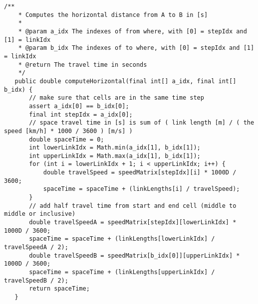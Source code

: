 \begin{lstlisting}[basicstyle=\tiny, style=java, caption={horizontal distance calculation}, label=lst:distance_calc_horizontal] 
	/**
	* Computes the horizontal distance from A to B in [s]
	*
	* @param a_idx The indexes of from where, with [0] = stepIdx and [1] = linkIdx
	* @param b_idx The indexes of to where, with [0] = stepIdx and [1] = linkIdx
	* @return The travel time in seconds
	*/
   public double computeHorizontal(final int[] a_idx, final int[] b_idx) {
	   // make sure that cells are in the same time step
	   assert a_idx[0] == b_idx[0];
	   final int stepIdx = a_idx[0];
	   // space travel time in [s] is sum of ( link length [m] / ( the speed [km/h] * 1000 / 3600 ) [m/s] )
	   double spaceTime = 0;
	   int lowerLinkIdx = Math.min(a_idx[1], b_idx[1]);
	   int upperLinkIdx = Math.max(a_idx[1], b_idx[1]);
	   for (int i = lowerLinkIdx + 1; i < upperLinkIdx; i++) {
		   double travelSpeed = speedMatrix[stepIdx][i] * 1000D / 3600;
		   spaceTime = spaceTime + (linkLengths[i] / travelSpeed);
	   }
	   // add half travel time from start and end cell (middle to middle or inclusive)
	   double travelSpeedA = speedMatrix[stepIdx][lowerLinkIdx] * 1000D / 3600;
	   spaceTime = spaceTime + (linkLengths[lowerLinkIdx] / travelSpeedA / 2);
	   double travelSpeedB = speedMatrix[b_idx[0]][upperLinkIdx] * 1000D / 3600;
	   spaceTime = spaceTime + (linkLengths[upperLinkIdx] / travelSpeedB / 2);
	   return spaceTime;
   }
\end{lstlisting}

